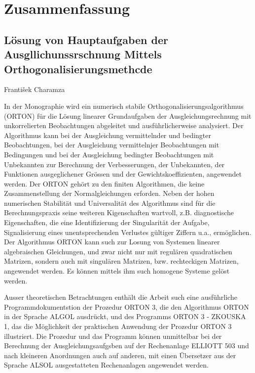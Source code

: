 
\chapter*{Zusammenfassung}
\section*{Lösung von Hauptaufgaben der Ausgllichunssrschnung
          Mittels Orthogonalisierungsmethcde}

\begin{center}
František Charamza
\end{center}

\noindent
%
In der Monographie wird ein numerisch stabile
Orthogonalisierungsalgorithmus (ORTON) für die Lösung linearer
Grundaufgaben der Ausgleichungsrechnung mit unkorrelierten
Beobachtungen abgeleitet und ausführlicherweise analysiert.  Der
Algorithmus kann bei der Ausgleichung vermittelnder und bedingter
Beobachtungen, bei der Ausgleichung vermittelnjer Beobachtungen mit
Bedingungen und bei der Ausgleichung bedingter Beobachtungen mit
Unbekannten zur Berechnung der Verbesserungen, der Unbekannten, der
Funktionen ausgeglichener Grössen und der Gewichtskoeffizienten,
angewendet werden. Der ORTON gehört zu den finiten Algorithmen, die
keine Zusammenstellung der Normalgleichungen erforden.  Neben der
hohen numerischen Stabilität und Universalität des Algorithmus sind
für die Berechnungspraxis seine weiteren Kigenschaften wartvoll,
z.B. diagnostische Eigenschaften, die eine Identifizierung der
Singularität der Aufgabe, Signalisierung eines unentsprechenden
Verlustes gültiger Ziffern u.a., ermöglichen. Der Algorithmus ORTON
kann such zur Losung von Systemen linearer algebraischen Gleichungen,
und zwar nicht nur mit regulären quadratischen Matrizen, sondern auch
mit singulären Matrizen, bzw. rechteckigen Matrizen, angewendet
werden. Es können mittels ihm such homogene Systeme gelöst werden.


Ausser theoretischen Betrachtungen enthält die Arbeit such eine
ausführliche Programmdokumentstion der Prozedur ORTON 3, die den
Algorithmus ORTON in der Sprache ALGOL ausdrückt, und des Programms
ORTON 3 - ZKOUSKA 1, das die Möglichkeit der praktischen Anwendung der
Prozedur ORTON 3 illustriert. Die Prozedur und das Programm können
unmittelbar bei der Berechnung der Ausgleichungsaufgsben auf der
Rechenanlage ELLIOTT 503 und nach kleineren Anordnungen auch auf
anderen, mit einen Übersetzer aus der Sprache ALSOL ausgestatteten
Rechenanlagen angewendet werden.
